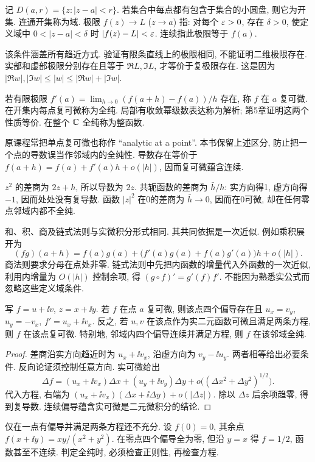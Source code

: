 \begin{definition}
记 $D(a,r)=\{z:|z-a|<r\}$. 若集合中每点都有包含于集合的小圆盘, 则它为开集. 连通开集称为域. 极限 $f(z)\to L$ ($z\to a$) 指: 对每个 $\varepsilon>0$, 存在 $\delta>0$, 使定义域中 $0<|z-a|<\delta$ 时 $|f(z)-L|<\varepsilon$. 连续指此极限等于 $f(a)$.
\end{definition}
该条件涵盖所有趋近方式. 验证有限条直线上的极限相同, 不能证明二维极限存在. 实部和虚部极限分别存在且等于 $\Re L,\Im L$, 才等价于复极限存在. 这是因为 $|\Re w|,|\Im w|\le |w|\le |\Re w|+|\Im w|$.
\begin{definition}
若有限极限 $f'(a)=\lim_{h\to0}(f(a+h)-f(a))/h$ 存在, 称 $f$ 在 $a$ 复可微. 在开集内每点复可微称为全纯. 局部有收敛幂级数表达称为解析; 第5章证明这两个性质等价. 在整个 $\mathbb C$ 全纯称为整函数.
\end{definition}
原课程常把单点复可微也称作 ``analytic at a point''. 本书保留上述区分, 防止把一个点的导数误当作邻域内的全纯性. 导数存在等价于 $f(a+h)=f(a)+f'(a)h+o(|h|)$, 因而复可微蕴含连续.

$z^2$ 的差商为 $2z+h$, 所以导数为 $2z$. 共轭函数的差商为 $\bar h/h$: 实方向得1, 虚方向得 $-1$, 因而处处没有复导数. 函数 $|z|^2$ 在0的差商为 $\bar h\to0$, 因而在0可微, 却在任何零点邻域内都不全纯.

和、积、商及链式法则与实微积分形式相同. 其共同依据是一次近似. 例如乘积展开为
\[
(fg)(a+h)=f(a)g(a)+\bigl(f'(a)g(a)+f(a)g'(a)\bigr)h+o(|h|).
\]
商法则要求分母在点处非零. 链式法则中先把内函数的增量代入外函数的一次近似, 利用内增量为 $O(|h|)$ 控制余项, 得 $(g\circ f)'=g'(f)f'$. 不能因为熟悉实公式而忽略这些定义域条件.

\begin{theorem}\label{thm:cr}
写 $f=u+\ii v$, $z=x+\ii y$. 若 $f$ 在点 $a$ 复可微, 则该点四个偏导存在且 $u_x=v_y$, $u_y=-v_x$, $f'=u_x+\ii v_x$. 反之, 若 $u,v$ 在该点作为实二元函数可微且满足两条方程, 则 $f$ 在该点复可微. 特别地, 邻域内四个偏导连续并满足方程, 则 $f$ 在该邻域全纯.
\end{theorem}
\begin{proof}
差商沿实方向趋近时为 $u_x+\ii v_x$, 沿虚方向为 $v_y-\ii u_y$. 两者相等给出必要条件. 反向论证须控制任意方向. 实可微给出
\[
\Delta f=(u_x+\ii v_x)\Delta x+(u_y+\ii v_y)\Delta y+o\bigl((\Delta x^2+\Delta y^2)^{1/2}\bigr).
\]
代入方程, 右端为 $(u_x+\ii v_x)(\Delta x+\ii\Delta y)+o(|\Delta z|)$. 除以 $\Delta z$ 后余项趋零, 得到复导数. 连续偏导蕴含实可微是二元微积分的结论.
\end{proof}
仅在一点有偏导并满足两条方程还不充分. 设 $f(0)=0$, 其余点 $f(x+\ii y)=xy/(x^2+y^2)$. 在零点四个偏导全为零, 但沿 $y=x$ 得 $f=1/2$, 函数甚至不连续. 判定全纯时, 必须检查正则性, 再检查方程.

